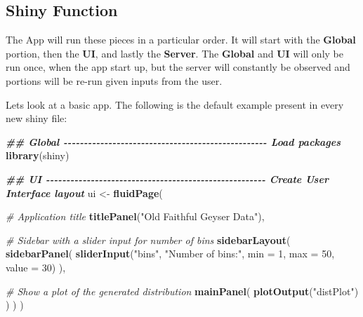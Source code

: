 \documentclass[
]{article}
\newenvironment{Shaded}{\begin{snugshade}}{\end{snugshade}}
\newcommand{\AttributeTok}[1]{\textcolor[rgb]{0.13,0.29,0.53}{#1}}
\newcommand{\CommentTok}[1]{\textcolor[rgb]{0.56,0.35,0.01}{\textit{#1}}}
\newcommand{\DecValTok}[1]{\textcolor[rgb]{0.00,0.00,0.81}{#1}}
\newcommand{\DocumentationTok}[1]{\textcolor[rgb]{0.56,0.35,0.01}{\textbf{\textit{#1}}}}
\newcommand{\FunctionTok}[1]{\textcolor[rgb]{0.13,0.29,0.53}{\textbf{#1}}}
\newcommand{\NormalTok}[1]{#1}
\newcommand{\OtherTok}[1]{\textcolor[rgb]{0.56,0.35,0.01}{#1}}
\newcommand{\StringTok}[1]{\textcolor[rgb]{0.31,0.60,0.02}{#1}}
\begin{document}
\newpage

\subsection{Shiny Function}\label{shiny-function}

The App will run these pieces in a particular order. It will start with
the \textbf{Global} portion, then the \textbf{UI}, and lastly the
\textbf{Server}. The \textbf{Global} and \textbf{UI} will only be run
once, when the app start up, but the server will constantly be observed
and portions will be re-run given inputs from the user.

Lets look at a basic app. The following is the default example present
in every new shiny file:

\begin{Shaded}
\begin{Highlighting}[]
    \DocumentationTok{\#\# Global {-}{-}{-}{-}{-}{-}{-}{-}{-}{-}{-}{-}{-}{-}{-}{-}{-}{-}{-}{-}{-}{-}{-}{-}{-}{-}{-}{-}{-}{-}{-}{-}{-}{-}{-}{-}{-}{-}{-}{-}{-}{-}{-}{-}{-}{-}{-}{-}{-}{-} Load packages}
\FunctionTok{library}\NormalTok{(shiny)}

    \DocumentationTok{\#\# UI {-}{-}{-}{-}{-}{-}{-}{-}{-}{-}{-}{-}{-}{-}{-}{-}{-}{-}{-}{-}{-}{-}{-}{-}{-}{-}{-}{-}{-}{-}{-}{-}{-}{-}{-}{-}{-}{-}{-}{-}{-}{-}{-}{-}{-}{-}{-}{-}{-}{-}{-}{-}{-}{-} Create User Interface layout}
\NormalTok{ui }\OtherTok{\textless{}{-}} \FunctionTok{fluidPage}\NormalTok{(}

    \CommentTok{\# Application title}
    \FunctionTok{titlePanel}\NormalTok{(}\StringTok{"Old Faithful Geyser Data"}\NormalTok{),}

    \CommentTok{\# Sidebar with a slider input for number of bins }
    \FunctionTok{sidebarLayout}\NormalTok{(}
        \FunctionTok{sidebarPanel}\NormalTok{(}
            \FunctionTok{sliderInput}\NormalTok{(}\StringTok{"bins"}\NormalTok{,}
                        \StringTok{"Number of bins:"}\NormalTok{,}
                        \AttributeTok{min =} \DecValTok{1}\NormalTok{,}
                        \AttributeTok{max =} \DecValTok{50}\NormalTok{,}
                        \AttributeTok{value =} \DecValTok{30}\NormalTok{)}
\NormalTok{        ),}

        \CommentTok{\# Show a plot of the generated distribution}
        \FunctionTok{mainPanel}\NormalTok{(}
           \FunctionTok{plotOutput}\NormalTok{(}\StringTok{"distPlot"}\NormalTok{)}
\NormalTok{        )}
\NormalTok{    )}
\NormalTok{)}


\end{Highlighting}
\end{Shaded}
\end{document}
